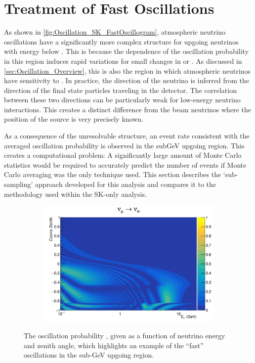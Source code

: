 \clearpage

\section{Treatment of Fast Oscillations}
\label{sec:Oscillation_FastOscillations}

As shown in \autoref{fig:Oscillation_SK_FastOscillogram}, atmospheric neutrino oscillations have a significantly more complex structure for upgoing neutrinos with energy below . This is because the  dependence of the oscillation probability in this region induces rapid variations for small changes in  or . As discussed in \autoref{sec:Oscillation_Overview}, this is also the region in which atmospheric neutrinos have sensitivity to . In practice, the direction of the neutrino is inferred from the direction of the final state particles traveling in the detector. The correlation between these two directions can be particularly weak for low-energy neutrino interactions. This creates a distinct difference from the beam neutrinos where the position of the source is very precisely known.

As a consequence of the unresolvable structure, an event rate consistent with the averaged oscillation probability is observed in the subGeV upgoing region. This creates a computational problem: A significantly large amount of Monte Carlo statistics would be required to accurately predict the number of events if Monte Carlo averaging was the only technique used. This section describes the `sub-sampling' approach developed for this analysis and compares it to the methodology used within the SK-only analysis.

\begin{figure}[h]
  \begin{subfigure}[t]{0.8\textwidth}
    \includegraphics[width=\textwidth, trim={0mm 0mm 0mm 0mm}, clip,page=1]{Figures/Oscillation/FastOscillationExample.pdf}
  \end{subfigure}
  \caption{The oscillation probability , given as a function of neutrino energy and zenith angle, which highlights an example of the ``fast'' oscillations in the sub-GeV upgoing region.}
  \label{fig:Oscillation_SK_FastOscillogram}
\end{figure}

